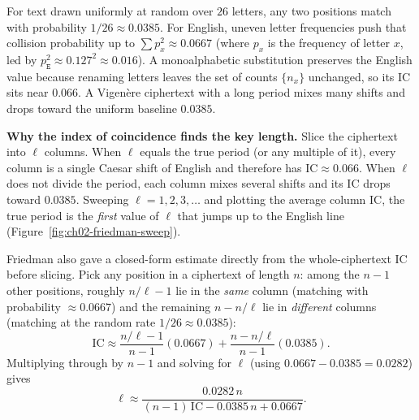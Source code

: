 For text drawn uniformly at random over $26$ letters, any two positions match with probability
$1/26 \approx 0.0385$. For English, uneven letter frequencies push that collision probability up
to $\sum p_x^2 \approx 0.0667$ (where $p_x$ is the frequency of letter $x$, led by
$p_{\texttt{E}}^2 \approx 0.127^2 \approx 0.016$). A monoalphabetic substitution preserves the
English value because renaming letters leaves the set of counts $\{n_x\}$ unchanged, so its
$\mathrm{IC}$ sits near $0.066$. A Vigen\`ere ciphertext with a long period mixes many shifts
and drops toward the uniform baseline $0.0385$.

\begin{whybox}
\textbf{Why the index of coincidence finds the key length.} Slice the ciphertext into $\ell$
columns. When $\ell$ equals the true period (or any multiple of it), every column is a single
Caesar shift of English and therefore has $\mathrm{IC} \approx 0.066$. When $\ell$ does not
divide the period, each column mixes several shifts and its $\mathrm{IC}$ drops toward $0.0385$.
Sweeping $\ell = 1, 2, 3, \ldots$ and plotting the average column $\mathrm{IC}$, the true period
is the \emph{first} value of $\ell$ that jumps up to the English line (Figure~\ref{fig:ch02-friedman-sweep}).

Friedman also gave a closed-form estimate directly from the whole-ciphertext $\mathrm{IC}$
before slicing. Pick any position in a ciphertext of length $n$: among the $n-1$ other
positions, roughly $n/\ell - 1$ lie in the \emph{same} column (matching with probability
$\approx 0.0667$) and the remaining $n - n/\ell$ lie in \emph{different} columns (matching at
the random rate $1/26 \approx 0.0385$):
\[
  \mathrm{IC} \approx \frac{n/\ell - 1}{n - 1}(0.0667) + \frac{n - n/\ell}{n - 1}(0.0385).
\]
Multiplying through by $n - 1$ and solving for $\ell$ (using $0.0667 - 0.0385 = 0.0282$) gives
\[
  \ell \approx \frac{0.0282\, n}{(n-1)\,\mathrm{IC} - 0.0385\, n + 0.0667}.
\]
\end{whybox}

